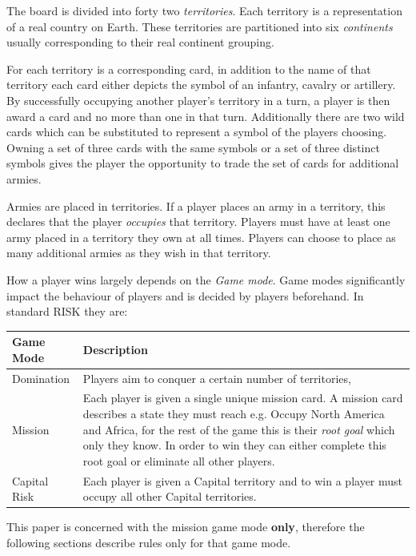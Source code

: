 \documentclass[parskip]{cs4rep}
\begin{document}
The board is divided into forty two \textit{territories}. Each territory is a representation of a real country on Earth. These territories are partitioned into six \textit{continents} usually corresponding to their real continent grouping.

For each territory is a corresponding card, in addition to the name of that territory each card either depicts the symbol of an infantry, cavalry or artillery. By successfully occupying another player's territory in a turn, a player is then award a card and no more than one in that turn. Additionally there are two wild cards which can be substituted to represent a symbol of the players choosing.
Owning a set of three cards with the same symbols or a set of three distinct symbols gives the player the opportunity to trade the set of cards for additional armies.

Armies are placed in territories. If a player places an army in a territory, this declares that the player \textit{occupies} that territory. Players must have at least one army placed in a territory they own at all times. Players can choose to place as many additional armies as they wish in that territory.

How a player wins largely depends on the \textit{Game mode}. Game modes significantly impact the behaviour of players and is decided by players beforehand. In standard RISK they are:
\newline

\begin{tabular}{|l|p{11cm}|}
\hline 
\textbf{Game Mode} & \textbf{Description} \\ 
\hline 
Domination & Players aim to conquer a certain number of territories, \\ 
\hline 
Mission & Each player is given a single unique mission card. A mission card describes a state they must reach e.g. Occupy North America and Africa, for the rest of the game this is their \textit{root goal} which only they know. In order to win they can either complete this root goal or eliminate all other players. \\ 
\hline 
Capital Risk & Each player is given a Capital territory and to win a player must occupy all other Capital territories. \\ 
\hline
\end{tabular} 
\newline

This paper is concerned with the mission game mode \textbf{only}, therefore the following sections describe rules only for that game mode.
\end{document}

